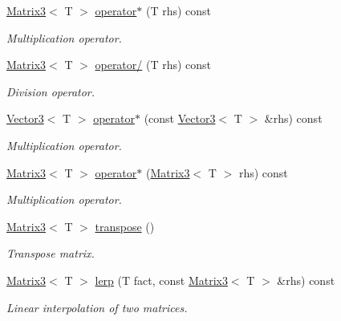 \begin{DoxyCompactItemize}
\hyperlink{class_matrix3}{Matrix3}$<$ T $>$ \hyperlink{class_matrix3_a4a7053f22eee3c50ef099181983370c9}{operator$\ast$} (T rhs) const 
\begin{DoxyCompactList}\small\item\em Multiplication operator. \item\end{DoxyCompactList}\item 
\hyperlink{class_matrix3}{Matrix3}$<$ T $>$ \hyperlink{class_matrix3_abf53af4ad067516b153c76a9e18cc410}{operator/} (T rhs) const 
\begin{DoxyCompactList}\small\item\em Division operator. \item\end{DoxyCompactList}\item 
\hyperlink{class_vector3}{Vector3}$<$ T $>$ \hyperlink{class_matrix3_add25a42745c41871b2d3b808f0d5047e}{operator$\ast$} (const \hyperlink{class_vector3}{Vector3}$<$ T $>$ \&rhs) const 
\begin{DoxyCompactList}\small\item\em Multiplication operator. \item\end{DoxyCompactList}\item 
\hyperlink{class_matrix3}{Matrix3}$<$ T $>$ \hyperlink{class_matrix3_abd84667793375507dc98fc8e896d89b3}{operator$\ast$} (\hyperlink{class_matrix3}{Matrix3}$<$ T $>$ rhs) const 
\begin{DoxyCompactList}\small\item\em Multiplication operator. \item\end{DoxyCompactList}\item 
\hyperlink{class_matrix3}{Matrix3}$<$ T $>$ \hyperlink{class_matrix3_aafac87a5bb5afd70a7a8b39257f28558}{transpose} ()
\begin{DoxyCompactList}\small\item\em Transpose matrix. \item\end{DoxyCompactList}\item 
\hyperlink{class_matrix3}{Matrix3}$<$ T $>$ \hyperlink{class_matrix3_a3c16292eeaf2514a4fc26de912cf07e0}{lerp} (T fact, const \hyperlink{class_matrix3}{Matrix3}$<$ T $>$ \&rhs) const 
\begin{DoxyCompactList}\small\item\em Linear interpolation of two matrices. \item\end{DoxyCompactList}\item 

\end{DoxyCompactItemize}
